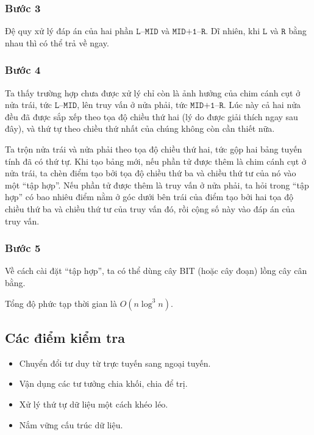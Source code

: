 \documentclass[11pt]{article}
\begin{document}
\subsubsection{Bước 3}

Đệ quy xử lý đáp án của hai phần \(\texttt{L}\)--\(\texttt{MID}\) và
\(\texttt{MID+1}\)--\(\texttt{R}\). Dĩ nhiên, khi \(\texttt{L}\) và
\(\texttt{R}\) bằng nhau thì có thể trả về ngay.

\subsubsection{Bước 4}

Ta thấy trường hợp chưa được xử lý chỉ còn là ảnh hưởng của chim cánh cụt ở
nửa trái, tức \(\texttt{L}\)--\(\texttt{MID}\), lên truy vấn ở nửa phải, tức
\(\texttt{MID+1}\)--\(\texttt{R}\). Lúc này cả hai nửa đều đã được sắp xếp
theo tọa độ chiều thứ hai (lý do được giải thích ngay sau đây), và thứ tự
theo chiều thứ nhất của chúng không còn cần thiết nữa.

Ta trộn nửa trái và nửa phải theo tọa độ chiều thứ hai, tức gộp hai bảng
tuyến tính đã có thứ tự. Khi tạo bảng mới, nếu phần tử được thêm là chim
cánh cụt ở nửa trái, ta chèn điểm tạo bởi tọa độ chiều thứ ba và chiều thứ tư
của nó vào một ``tập hợp''. Nếu phần tử được thêm là truy vấn ở nửa phải, ta
hỏi trong ``tập hợp'' có bao nhiêu điểm nằm ở góc dưới bên trái của điểm tạo
bởi hai tọa độ chiều thứ ba và chiều thứ tư của truy vấn đó, rồi cộng số này
vào đáp án của truy vấn.

\subsubsection{Bước 5}

Về cách cài đặt ``tập hợp'', ta có thể dùng cây BIT (hoặc cây đoạn) lồng cây
cân bằng.

Tổng độ phức tạp thời gian là \(O(n\log^3 n)\).

\subsection{Các điểm kiểm tra}

\begin{itemize}
  \item Chuyển đổi tư duy từ trực tuyến sang ngoại tuyến.
  \item Vận dụng các tư tưởng chia khối, chia để trị.
  \item Xử lý thứ tự dữ liệu một cách khéo léo.
  \item Nắm vững cấu trúc dữ liệu.
\end{itemize}
\end{document}
